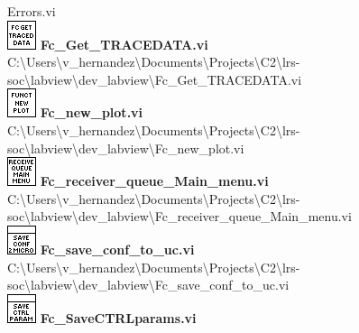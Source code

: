 \documentclass[
]{article}
\begin{document}
Errors.vi\\
\includegraphics{Fc_Get_TRACEDATA_viLVtemp20240312184737_3_0.png}
\textbf{Fc\_Get\_TRACEDATA.vi\\
}
C:\textbackslash Users\textbackslash v\_hernandez\textbackslash Documents\textbackslash Projects\textbackslash C2\textbackslash lrs-soc\textbackslash labview\textbackslash dev\_labview\textbackslash Fc\_Get\_TRACEDATA.vi\\
\includegraphics{Fc_new_plot_viLVtemp20240312184737_4_0.png}
\textbf{Fc\_new\_plot.vi\\
}
C:\textbackslash Users\textbackslash v\_hernandez\textbackslash Documents\textbackslash Projects\textbackslash C2\textbackslash lrs-soc\textbackslash labview\textbackslash dev\_labview\textbackslash Fc\_new\_plot.vi\\
\includegraphics{Fc_receiver_queue_Main_menu_viLVtemp20240312184737_5_0.png}
\textbf{Fc\_receiver\_queue\_Main\_menu.vi\\
}
C:\textbackslash Users\textbackslash v\_hernandez\textbackslash Documents\textbackslash Projects\textbackslash C2\textbackslash lrs-soc\textbackslash labview\textbackslash dev\_labview\textbackslash Fc\_receiver\_queue\_Main\_menu.vi\\
\includegraphics{Fc_save_conf_to_uc_viLVtemp20240312184737_6_0.png}
\textbf{Fc\_save\_conf\_to\_uc.vi\\
}
C:\textbackslash Users\textbackslash v\_hernandez\textbackslash Documents\textbackslash Projects\textbackslash C2\textbackslash lrs-soc\textbackslash labview\textbackslash dev\_labview\textbackslash Fc\_save\_conf\_to\_uc.vi\\
\includegraphics{Fc_SaveCTRLparams_viLVtemp20240312184737_7_0.png}
\textbf{Fc\_SaveCTRLparams.vi\\
}
\end{document}
